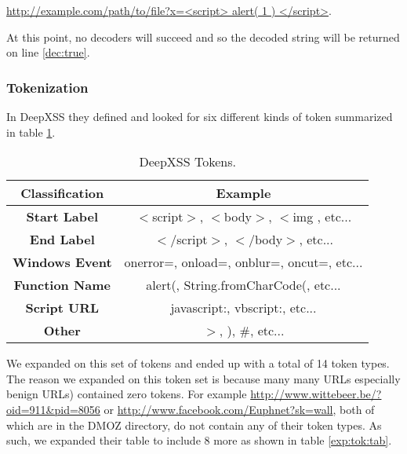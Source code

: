 \url{http://example.com/path/to/file?x=<script> alert( 1 ) </script>}. 

At this point, no decoders will succeed and so the decoded string will be returned on line \ref{dec:true}.


\subsubsection{Tokenization}
In DeepXSS they defined and looked for six different kinds of token summarized in table \ref{tok:tab}.

\begin{table}
\begin{center}
\begin{tabular}{||c | c||} 
    \hline
    Classification & Example \\ [0.5ex] 
    \hline\hline
    \textbf{Start Label} &  $<$script$>$, $<$body$>$, $<$img , etc... \\ 
    \hline
    \textbf{End Label} & $</$script$>$, $</$body$>$, etc... \\
    \hline
    \textbf{Windows Event} & onerror=, onload=, onblur=, oncut=, etc... \\
    \hline
    \textbf{Function Name} & alert(, String.fromCharCode(, etc... \\
    \hline
    \textbf{Script URL} & javascript:, vbscript:, etc... \\ 
    \hline
    \textbf{Other} & $>$, ), \#, etc... \\ [1ex] 
    \hline
\end{tabular}
\caption{\label{tok:tab}DeepXSS Tokens.}
\end{center}
\end{table}

We expanded on this set of tokens and ended up with a total of 14 token types. The reason we expanded on this token set is because many many URLs especially benign URLs) contained zero tokens. For example \url{http://www.wittebeer.be/?oid=911\&pid=8056} or \url{http://www.facebook.com/Euphnet?sk=wall}, both of which are in the DMOZ directory, do not contain any of their token types. As such, we expanded their table to include 8 more as shown in table \ref{exp:tok:tab}.

